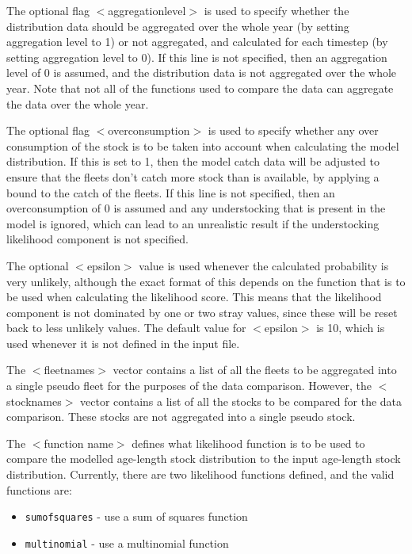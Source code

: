 \documentclass[]{book}
\providecommand{\tightlist}{%
  \setlength{\itemsep}{0pt}\setlength{\parskip}{0pt}}
\begin{document}
The optional flag \(<\)aggregationlevel\(>\) is used to specify whether the
distribution data should be aggregated over the whole year (by setting
aggregation level to 1) or not aggregated, and calculated for each
timestep (by setting aggregation level to 0). If this line is not
specified, then an aggregation level of 0 is assumed, and the
distribution data is not aggregated over the whole year. Note that not
all of the functions used to compare the data can aggregate the data
over the whole year.

The optional flag \(<\)overconsumption\(>\) is used to specify whether any
over consumption of the stock is to be taken into account when
calculating the model distribution. If this is set to 1, then the model
catch data will be adjusted to ensure that the fleets don't catch more
stock than is available, by applying a bound to the catch of the fleets.
If this line is not specified, then an overconsumption of 0 is assumed
and any understocking that is present in the model is ignored, which can
lead to an unrealistic result if the understocking likelihood component
is not specified.

The optional \(<\)epsilon\(>\) value is used whenever the calculated
probability is very unlikely, although the exact format of this depends
on the function that is to be used when calculating the likelihood
score. This means that the likelihood component is not dominated by one
or two stray values, since these will be reset back to less unlikely
values. The default value for \(<\)epsilon\(>\) is 10, which is used
whenever it is not defined in the input file.

The \(<\)fleetnames\(>\) vector contains a list of all the fleets to be
aggregated into a single pseudo fleet for the purposes of the data
comparison. However, the \(<\)stocknames\(>\) vector contains a list of all
the stocks to be compared for the data comparison. These stocks are not
aggregated into a single pseudo stock.

The \(<\)function name\(>\) defines what likelihood function is to be used
to compare the modelled age-length stock distribution to the input
age-length stock distribution. Currently, there are two likelihood
functions defined, and the valid functions are:

\begin{itemize}
\tightlist
\item
  \texttt{sumofsquares} - use a sum of squares function
\item
  \texttt{multinomial} - use a multinomial function
\end{itemize}
\end{document}
